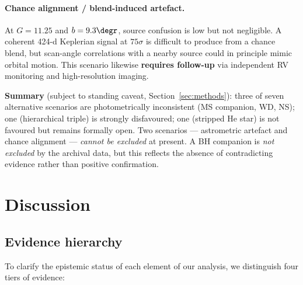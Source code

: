 \documentclass[usenatbib,fleqn]{mnras}
\begin{document}
\paragraph*{Chance alignment / blend-induced artefact.}
At $G = 11.25$ and $b = 9.3\degr$, source confusion is low but
not negligible.  A coherent 424-d Keplerian signal at $75\sigma$
is difficult to produce from a chance blend, but scan-angle
correlations with a nearby source could in principle mimic orbital
motion.  This scenario likewise \textbf{requires follow-up}
via independent RV monitoring and high-resolution imaging.

\medskip\noindent
\textbf{Summary} (subject to standing caveat,
Section~\ref{sec:methods}):\textbf{} three of seven
alternative scenarios are photometrically inconsistent
(MS companion, WD, NS); one (hierarchical triple) is strongly
disfavoured; one (stripped He star) is not favoured but remains
formally open.  Two scenarios --- astrometric artefact
and chance alignment --- \emph{cannot be excluded} at present.
A BH companion is \emph{not excluded} by the archival data, but
this reflects the absence of contradicting evidence rather
than positive confirmation.

\section{Discussion}
\label{sec:discussion}

\subsection{Evidence hierarchy}
\label{sec:evidence_hierarchy}

To clarify the epistemic status of each element of our analysis,
we distinguish four tiers of evidence:
\end{document}

